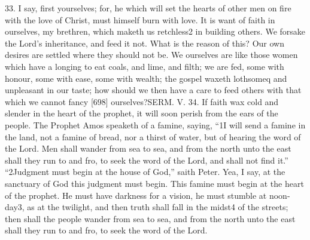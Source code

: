 33. I say, first yourselves; for, he which will set the hearts of other men on fire with the love of Christ, must himself burn with love. It is want of faith in ourselves, my brethren, which maketh us retchless2 in building others. We forsake the Lord’s inheritance, and feed it not. What is the reason of this? Our own desires are settled where they should not be. We ourselves are like those women which have a longing to eat coals, and lime, and filth; we are fed, some with honour, some with ease, some with wealth; the gospel waxeth lothsomeq and unpleasant in our taste; how should we then have a care to feed others with that which we cannot fancy [698] ourselves?SERM. V. 34. If faith wax cold and slender in the heart of the prophet, it will soon perish from the ears of the people. The Prophet Amos speaketh of a famine, saying, “1I will send a famine in the land, not a famine of bread, nor a thirst of water, but of hearing the word of the Lord. Men shall wander from sea to sea, and from the north unto the east shall they run to and fro, to seek the word of the Lord, and shall not find it.” “2Judgment must begin at the house of God,” saith Peter. Yea, I say, at the sanctuary of God this judgment must begin. This famine must begin at the heart of the prophet. He must have darkness for a vision, he must stumble at noon-day3, as at the twilight, and then truth shall fall in the midst4 of the streets; then shall the people wander from sea to sea, and from the north unto the east shall they run to and fro, to seek the word of the Lord.


